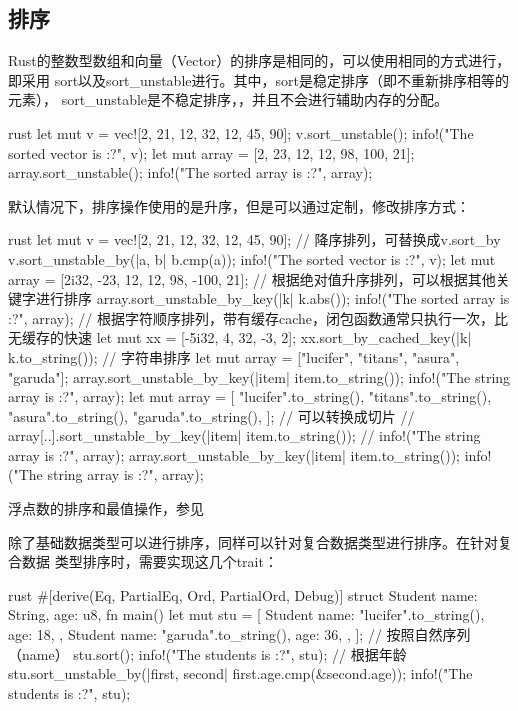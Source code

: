 \subsection{排序}
Rust的整数型数组和向量（Vector）的排序是相同的，可以使用相同的方式进行，即采用
sort以及sort\_unstable进行。其中，sort是稳定排序（即不重新排序相等的元素），
sort\_unstable是不稳定排序，，并且不会进行辅助内存的分配。
\begin{code-block}{rust}
let mut v = vec![2, 21, 12, 32, 12, 45, 90];
v.sort_unstable();
info!("The sorted vector is {:?}", v);
let mut array = [2, 23, 12, 12, 98, 100, 21];
array.sort_unstable();
info!("The sorted array is {:?}", array);
\end{code-block}
默认情况下，排序操作使用的是升序，但是可以通过定制，修改排序方式：
\begin{code-block}{rust}
let mut v = vec![2, 21, 12, 32, 12, 45, 90];
// 降序排列，可替换成v.sort_by
v.sort_unstable_by(|a, b| b.cmp(a));
info!("The sorted vector is {:?}", v);
let mut array = [2i32, -23, 12, 12, 98, -100, 21];
// 根据绝对值升序排列，可以根据其他关键字进行排序
array.sort_unstable_by_key(|k| k.abs());
info!("The sorted array is {:?}", array);
// 根据字符顺序排列，带有缓存cache，闭包函数通常只执行一次，比无缓存的快速
let mut xx = [-5i32, 4, 32, -3, 2];
xx.sort_by_cached_key(|k| k.to_string());
// 字符串排序
let mut array = ["lucifer", "titans", "asura", "garuda"];
array.sort_unstable_by_key(|item| item.to_string());
info!("The string array is {:?}", array);
let mut array = [
    "lucifer".to_string(),
    "titans".to_string(),
    "asura".to_string(),
    "garuda".to_string(),
];
// 可以转换成切片
// array[..].sort_unstable_by_key(|item| item.to_string());
// info!("The string array is {:?}", array);
array.sort_unstable_by_key(|item| item.to_string());
info!("The string array is {:?}", array);
\end{code-block}

浮点数的排序和最值操作，参见

除了基础数据类型可以进行排序，同样可以针对复合数据类型进行排序。在针对复合数据
类型排序时，需要实现这几个trait：
\begin{code-block}{rust}
#[derive(Eq, PartialEq, Ord, PartialOrd, Debug)]
struct Student {
    name: String,
    age: u8,
}
fn main() {
    let mut stu = [
        Student {
            name: "lucifer".to_string(),
            age: 18,
        },
        Student {
            name: "garuda".to_string(),
            age: 36,
        },
    ];
    // 按照自然序列（name）
    stu.sort();
    info!("The students is {:?}", stu);
    // 根据年龄
    stu.sort_unstable_by(|first, second| first.age.cmp(&second.age));
    info!("The students is {:?}", stu);
}
\end{code-block}

